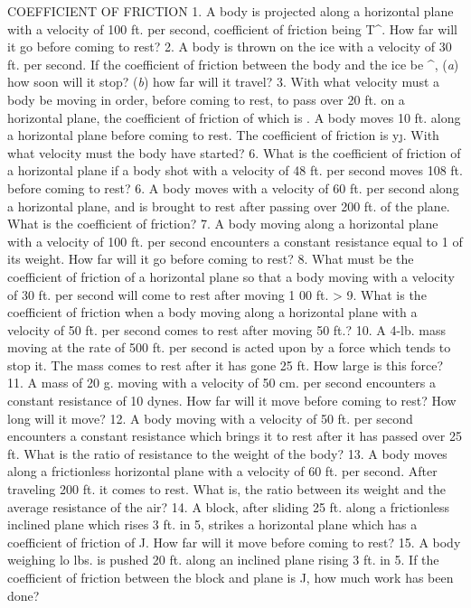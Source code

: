 COEFFICIENT OF FRICTION
1. A body is projected along a horizontal plane with a velocity of 100 ft. per second, coefficient of friction being T^. How far will it go before coming to rest?
2. A body is thrown on the ice with a velocity of 30 ft. per second. If the coefficient of friction between the body and the ice be ^, (\emph{a}) how soon will it stop? (\emph{b}) how far will it travel?
3. With what velocity must a body be moving in order, before coming to rest, to pass over 20 ft. on a horizontal plane, the coefficient of friction of which is . A body moves 10 ft. along a horizontal plane before coming to rest. The coefficient of friction is y\j. With what velocity must the body have started?
6. What is the coefficient of friction of a horizontal plane if a body shot with a velocity of 48 ft. per second moves 108 ft. before coming to rest?
6. A body moves with a velocity of 60 ft. per second along a horizontal plane, and is brought to rest after passing over 200 ft. of the plane. What is the coefficient of friction?
7. A body moving along a horizontal plane with a velocity of 100 ft. per second encounters a constant resistance equal to 1 of its weight. How far will it go before coming to rest?
8. What must be the coefficient of friction of a horizontal plane so that a body moving with a velocity of 30 ft. per second will come to rest after moving 1 00 ft. >
9. What is the coefficient of friction when a body moving along a horizontal plane with a velocity of 50 ft. per second comes to rest after moving 50 ft.?
10. A 4-lb. mass moving at the rate of 500 ft. per second is acted upon by a force which tends to stop it. The mass comes to rest after it has gone 25 ft. How large is this force?
11. A mass of 20 g. moving with a velocity of 50 cm. per second encounters a constant resistance of 10 dynes. How far will it move before coming to rest? How long will it move?
12. A body moving with a velocity of 50 ft. per second encounters a constant resistance which brings it to rest after it has passed over 25 ft. What is the ratio of resistance to the weight of the body?
13. A body moves along a frictionless horizontal plane with a velocity of 60 ft. per second. After traveling 200 ft. it comes to rest. What is, the ratio between its weight and the average resistance of the air?
14. A block, after sliding 25 ft. along a frictionless inclined plane which rises 3 ft. in 5, strikes a horizontal plane which has a coefficient of friction of J. How far will it move before coming to rest?
15. A body weighing lo lbs. is pushed 20 ft. along an inclined plane rising 3 ft. in 5. If the coefficient of friction between the block and plane is J, how much work has been done?
